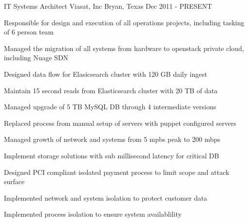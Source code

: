 

\begin{cventries}

  \cventry
    {IT Systems Architect} %
    {Viasat, Inc} %
    {Bryan, Texas} %
    {Dec 2011 - PRESENT} %
    {
      \begin{cvitems} %
        \item {Responsible for design and execution of all operations projects, including tasking of 6 person team}
        \item {Managed the migration of all systems from hardware to openstack private cloud, including Nuage SDN}
        \item {Designed data flow for Elasicsearch cluster with 120 GB daily ingest}
        \item {Maintain 15 second reads from Elasticsearch cluster with 20 TB of data}
        \item {Managed upgrade of 5 TB MySQL DB through 4 intermediate versions}
        \item {Replaced process from manual setup of servers with puppet configured servers}
        \item {Managed growth of network and systems from 5 mpbs peak to 200 mbps}
        \item {Implement storage solutions with sub millisecond latency for critical DB}
        \item {Designed PCI compliant isolated payment process to limit scope and attack surface}
        \item {Implemented network and system isolation to protect customer data}
        \item {Implemented process isolation to ensure system availablility}
      \end{cvitems}
    }


\end{cventries}
